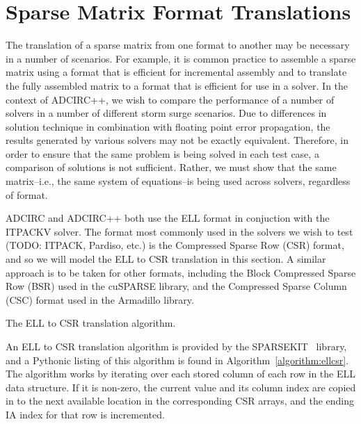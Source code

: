 \section{Sparse Matrix Format Translations}
\label{sec:trans}

The translation of a sparse matrix from one format to another may be necessary in a number of scenarios.  For example, it is common practice to assemble a sparse matrix using a format that is efficient for incremental assembly and to translate the fully assembled matrix to a format that is efficient for use in a solver.  In the context of ADCIRC++, we wish to compare the performance of a number of solvers in a number of different storm surge scenarios.  
Due to differences in solution technique in combination with floating point error propagation, the results generated by various solvers may not be exactly equivalent.  Therefore, in order to ensure that the same problem is being solved in each test case, a comparison of solutions is not sufficient.  Rather, we must show that the same matrix--i.e., the same system of equations--is being used across solvers, regardless of format.

ADCIRC and ADCIRC++ both use the ELL format in conjuction with the ITPACKV solver.  The format most commonly used in the solvers we wish to test (TODO: ITPACK, Pardiso, etc.) is the Compressed Sparse Row (CSR) format, and so we will model the ELL to CSR translation in this section.  A similar approach is to be taken for other formats, including the Block Compressed Sparse Row (BSR) used in the cuSPARSE library, and the Compressed Sparse Column (CSC) format used in the Armadillo library.

\LinesNumbered
\begin{algorithm}

\caption{The ELL to CSR translation algorithm.}
\label{algorithm:ellcsr}
\end{algorithm}
\LinesNotNumbered

An ELL to CSR translation algorithm is provided by the SPARSEKIT~\cite{sparsekit} library, and a Pythonic listing of this algorithm is found in Algorithm~\ref{algorithm:ellcsr}.  The algorithm works by iterating over each stored column of each row in the ELL data structure.  If it is non-zero, the current value and its column index are copied in to the next available location in the corresponding CSR arrays, and the ending IA index for that row is incremented.

